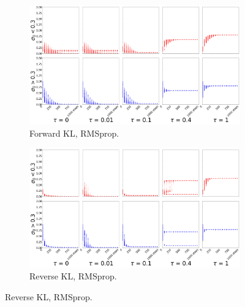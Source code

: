 \documentclass{article}
\begin{document}
\begin{figure}[!ht]
  \begin{subfigure}[b]{0.4\linewidth}
    \centering
    \includegraphics[width=1\columnwidth]{figs/bandit/notlearnQ/modes=1/rmsprop/std_forward_optim=rmsprop_modes=1_lr=0.01.png}
    \caption{Forward KL, RMSprop.}
    \label{fig:bandit-std-forward-rmsprop}
  \end{subfigure}%
  \begin{subfigure}[b]{0.4\linewidth}
    \centering
    \includegraphics[width=1\columnwidth]{figs/bandit/notlearnQ/modes=1/rmsprop/std_reverse_optim=rmsprop_modes=1_lr=0.01.png}
    \caption{Reverse KL, RMSprop.}
    \label{fig:bandit-std-reverse-rmsprop}
  \end{subfigure}
  

\end{figure}
\end{document}
